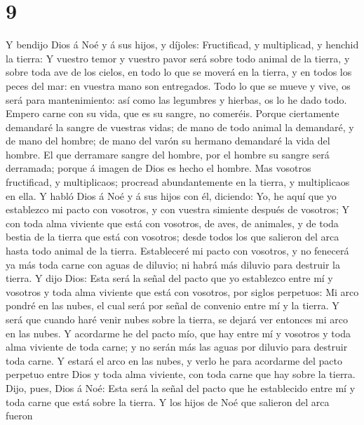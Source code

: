 \hypertarget{section-8}{%
\section{9}\label{section-8}}

 Y bendijo Dios á Noé y á sus hijos, y díjoles: Fructificad,
y multiplicad, y henchid la tierra:  Y vuestro temor y
vuestro pavor será sobre todo animal de la tierra, y sobre toda ave de
los cielos, en todo lo que se moverá en la tierra, y en todos los peces
del mar: en vuestra mano son entregados.  Todo lo que se
mueve y vive, os será para mantenimiento: así como las legumbres y
hierbas, os lo he dado todo.  Empero carne con su vida, que
es su sangre, no comeréis.  Porque ciertamente demandaré la
sangre de vuestras vidas; de mano de todo animal la demandaré, y de mano
del hombre; de mano del varón su hermano demandaré la vida del hombre.
 El que derramare sangre del hombre, por el hombre su sangre
será derramada; porque á imagen de Dios es hecho el hombre. 
Mas vosotros fructificad, y multiplicaos; procread abundantemente en la
tierra, y multiplicaos en ella.  Y habló Dios á Noé y á sus
hijos con él, diciendo:  Yo, he aquí que yo establezco mi
pacto con vosotros, y con vuestra simiente después de vosotros;
 Y con toda alma viviente que está con vosotros, de aves,
de animales, y de toda bestia de la tierra que está con vosotros; desde
todos los que salieron del arca hasta todo animal de la tierra.
 Estableceré mi pacto con vosotros, y no fenecerá ya más
toda carne con aguas de diluvio; ni habrá más diluvio para destruir la
tierra.  Y dijo Dios: Esta será la señal del pacto que yo
establezco entre mí y vosotros y toda alma viviente que está con
vosotros, por siglos perpetuos:  Mi arco pondré en las
nubes, el cual será por señal de convenio entre mí y la tierra.
 Y será que cuando haré venir nubes sobre la tierra, se
dejará ver entonces mi arco en las nubes.  Y acordarme he
del pacto mío, que hay entre mí y vosotros y toda alma viviente de toda
carne; y no serán más las aguas por diluvio para destruir toda carne.
 Y estará el arco en las nubes, y verlo he para acordarme
del pacto perpetuo entre Dios y toda alma viviente, con toda carne que
hay sobre la tierra.  Dijo, pues, Dios á Noé: Esta será la
señal del pacto que he establecido entre mí y toda carne que está sobre
la tierra.  Y los hijos de Noé que salieron del arca fueron
